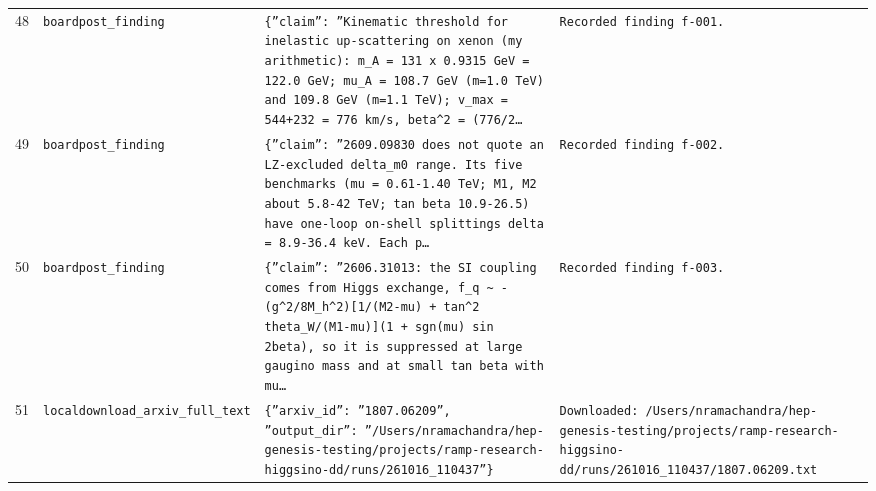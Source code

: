 \documentclass[11pt,a4paper]{article}
\begin{document}
\begin{longtable}{@{}p{}p{}p{}p{}@{}}
48 & \texttt{board}\newline\texttt{post\_\allowbreak{}finding} & \texttt{\{''claim'':\allowbreak{} ''Kinematic threshold for inelastic up-scattering on xenon (my arithmetic)\allowbreak{}:\allowbreak{} m\_\allowbreak{}A =\allowbreak{} 131 x 0.9315 GeV =\allowbreak{} 122.0 GeV;\allowbreak{} mu\_\allowbreak{}A =\allowbreak{} 108.7 GeV (m=\allowbreak{}1.0 TeV)\allowbreak{} and 109.8 GeV (m=\allowbreak{}1.1 TeV)\allowbreak{};\allowbreak{} v\_\allowbreak{}max =\allowbreak{} 544+232 =\allowbreak{} 776 km/\allowbreak{}s,\allowbreak{} beta\textasciicircum{}\allowbreak{}2 =\allowbreak{} (776/\allowbreak{}2\ldots{}\allowbreak{}} & \texttt{Recorded finding f-001.} \\
49 & \texttt{board}\newline\texttt{post\_\allowbreak{}finding} & \texttt{\{''claim'':\allowbreak{} ''2609.09830 does not quote an LZ-excluded delta\_\allowbreak{}m0 range. Its five benchmarks (\textbar{}\allowbreak{}mu\textbar{}\allowbreak{} =\allowbreak{} 0.61-1.40 TeV;\allowbreak{} \textbar{}\allowbreak{}M1\textbar{}\allowbreak{},\allowbreak{} M2 about 5.8-42 TeV;\allowbreak{} tan beta 10.9-26.5)\allowbreak{} have one-loop on-shell splittings delta =\allowbreak{} 8.9-36.4 keV. Each p\ldots{}\allowbreak{}} & \texttt{Recorded finding f-002.} \\
50 & \texttt{board}\newline\texttt{post\_\allowbreak{}finding} & \texttt{\{''claim'':\allowbreak{} ''2606.31013:\allowbreak{} the SI coupling comes from Higgs exchange,\allowbreak{} f\_\allowbreak{}q \textasciitilde{}\allowbreak{} -(g\textasciicircum{}\allowbreak{}2/\allowbreak{}8M\_\allowbreak{}h\textasciicircum{}\allowbreak{}2)\allowbreak{}[1/\allowbreak{}(M2-\textbar{}\allowbreak{}mu\textbar{}\allowbreak{})\allowbreak{} + tan\textasciicircum{}\allowbreak{}2 theta\_\allowbreak{}W/\allowbreak{}(M1-\textbar{}\allowbreak{}mu\textbar{}\allowbreak{})\allowbreak{}]\allowbreak{}(1 + sgn(mu)\allowbreak{} sin 2beta)\allowbreak{},\allowbreak{} so it is suppressed at large gaugino mass and at small tan beta with mu\ldots{}\allowbreak{}} & \texttt{Recorded finding f-003.} \\
51 & \texttt{local}\newline\texttt{download\_\allowbreak{}arxiv\_\allowbreak{}full\_\allowbreak{}text} & \texttt{\{''arxiv\_\allowbreak{}id'':\allowbreak{} ''1807.06209'',\allowbreak{} ''output\_\allowbreak{}dir'':\allowbreak{} ''/\allowbreak{}Users/\allowbreak{}nramachandra/\allowbreak{}hep-genesis-testing/\allowbreak{}projects/\allowbreak{}ramp-research-higgsino-dd/\allowbreak{}runs/\allowbreak{}261016\_\allowbreak{}110437''\}\allowbreak{}} & \texttt{Downloaded:\allowbreak{} /\allowbreak{}Users/\allowbreak{}nramachandra/\allowbreak{}hep-genesis-testing/\allowbreak{}projects/\allowbreak{}ramp-research-higgsino-dd/\allowbreak{}runs/\allowbreak{}261016\_\allowbreak{}110437/\allowbreak{}1807.06209.txt} \\

\end{longtable}
\end{document}
